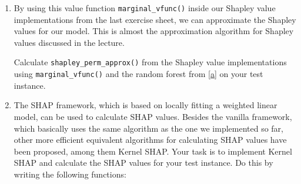 {\begin{enumerate}
    \item 
    By using this value function \texttt{marginal\_vfunc()} inside our Shapley value implementations
    from the last exercise sheet,
    we can approximate the Shapley values for our model.
    This is almost the approximation algorithm for Shapley values discussed in the lecture.

    Calculate \texttt{shapley\_perm\_approx()} from the Shapley value implementations using \texttt{marginal\_vfunc()} and the random forest from \ref{a} on your test instance.

    \item 
    The SHAP framework, which is based on locally fitting a weighted linear model, can be used to calculate SHAP values.
    Besides the vanilla framework, which basically uses the same algorithm as the one we implemented so far, other more efficient equivalent algorithms for calculating SHAP values have been proposed, among them Kernel SHAP.
    Your task is to implement Kernel SHAP and calculate the SHAP values for your test instance.
    Do this by writing the following functions:
    

\end{enumerate}}
